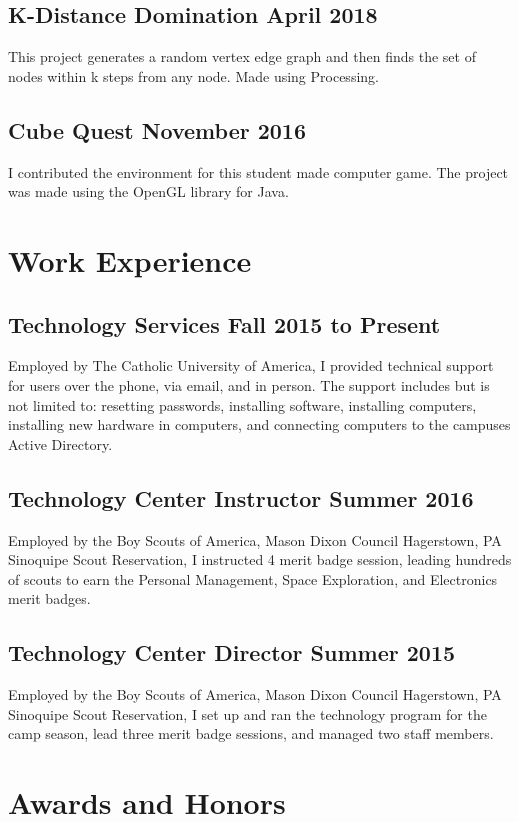 \documentclass{article}
\begin{document}
\subsection{K-Distance Domination \hfill April 2018}
This project generates a random vertex edge graph and then finds the set of nodes within k steps from any node.
Made using Processing.

\subsection{Cube Quest \hfill November 2016}
I contributed the environment for this student made computer game.
The project was made using the OpenGL library for Java.


\section{Work Experience}
\subsection{Technology Services \hfill Fall 2015 to Present}
Employed by The Catholic University of America,
I provided technical support for users over the phone, via email, and in person.
The support includes but is not limited to:
resetting passwords,
installing software,
installing computers,
installing new hardware in computers,
and
connecting computers to the campuses Active Directory.

\subsection{Technology Center Instructor \hfill Summer 2016}
Employed by the Boy Scouts of America, Mason Dixon Council Hagerstown, PA Sinoquipe Scout Reservation,
I instructed 4 merit badge session, leading hundreds of scouts to earn the
Personal Management,
Space Exploration,
and
Electronics
merit badges.
\subsection{Technology Center Director \hfill Summer 2015}
Employed by the Boy Scouts of America, Mason Dixon Council Hagerstown, PA Sinoquipe Scout Reservation,
I set up and ran the technology program for the camp season,
lead three merit badge sessions,
and managed two staff members.
\section{Awards and Honors}
\end{document}
